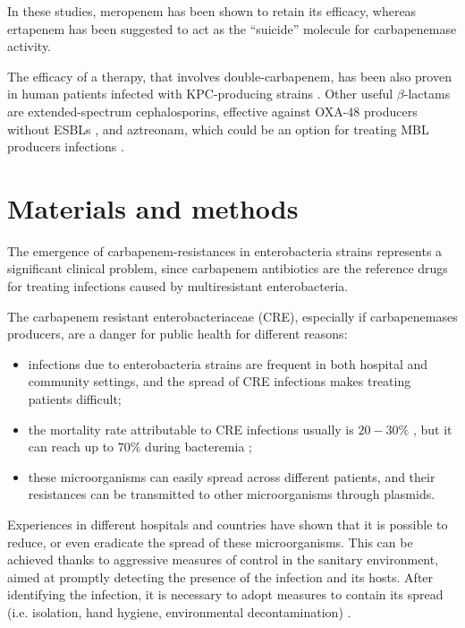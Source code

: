 \documentclass[11pt]{report}
\begin{document}
In these studies, meropenem has been shown to retain its efficacy, whereas ertapenem has been suggested to act as the ``suicide'' molecule for carbapenemase activity.

The efficacy of a therapy, that involves double-carbapenem, has been also proven in human patients infected with KPC-producing strains \cite{giamarellou2013effectiveness}.
Other useful $\beta$-lactams are extended-spectrum cephalosporins, effective against OXA-48 producers without ESBLs \cite{mimoz2012broad}, and aztreonam, which could be an option for treating MBL producers infections \cite{nordmann2011emerging}.

\chapter{Materials and methods}

The emergence of carbapenem-resistances in enterobacteria strains represents a significant clinical problem, since carbapenem antibiotics are the reference drugs for treating infections caused by multiresistant enterobacteria.

The carbapenem resistant enterobacteriaceae (CRE), especially if carbapenemases producers, are a danger for public health for different reasons:
\begin{itemize}
\item infections due to enterobacteria strains are frequent in both hospital and community settings, and the spread of CRE infections makes treating patients difficult;
\item the mortality rate attributable to CRE infections usually is $20-30\%$ \cite{carmeli2010controlling}, but it can reach up to $70\%$ during bacteremia \cite{mouloudi2010bloodstream};
\item these microorganisms can easily spread across different patients, and their resistances can be transmitted to other microorganisms through plasmids.
\end{itemize}

Experiences in different hospitals and countries have shown that it is possible to reduce, or even eradicate the spread of these microorganisms.
This can be achieved thanks to aggressive measures of control in the sanitary environment, aimed at promptly detecting the presence of the infection and its hosts.
After identifying the infection, it is necessary to adopt measures to contain its spread (i.e. isolation, hand hygiene, environmental decontamination) \cite{gupta2011carbapenem}.
\end{document}
